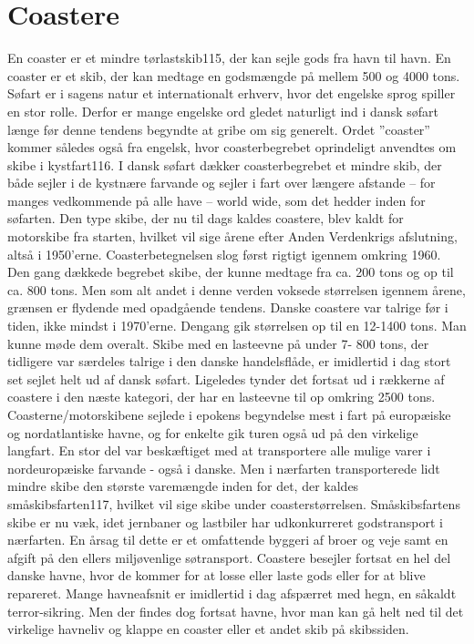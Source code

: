 \part{Coastere}\label{coastere}

En coaster er et mindre tørlastskib115, der kan sejle gods fra havn til
havn. En coaster er et skib, der kan medtage en godsmængde på mellem 500
og 4000 tons. Søfart er i sagens natur et internationalt erhverv, hvor
det engelske sprog spiller en stor rolle. Derfor er mange engelske ord
gledet naturligt ind i dansk søfart længe før denne tendens begyndte at
gribe om sig generelt. Ordet ''coaster'' kommer således også fra
engelsk, hvor coasterbegrebet oprindeligt anvendtes om skibe i
kystfart116. I dansk søfart dækker coasterbegrebet et mindre skib, der
både sejler i de kystnære farvande og sejler i fart over længere
afstande -- for manges vedkommende på alle have -- world wide, som det
hedder inden for søfarten. Den type skibe, der nu til dags kaldes
coastere, blev kaldt for motorskibe fra starten, hvilket vil sige årene
efter Anden Verdenkrigs afslutning, altså i 1950'erne.
Coasterbetegnelsen slog først rigtigt igennem omkring 1960. Den gang
dækkede begrebet skibe, der kunne medtage fra ca. 200 tons og op til ca.
800 tons. Men som alt andet i denne verden voksede størrelsen igennem
årene, grænsen er flydende med opadgående tendens. Danske coastere var
talrige før i tiden, ikke mindst i 1970'erne. Dengang gik størrelsen op
til en 12-1400 tons. Man kunne møde dem overalt. Skibe med en lasteevne
på under 7- 800 tons, der tidligere var særdeles talrige i den danske
handelsflåde, er imidlertid i dag stort set sejlet helt ud af dansk
søfart. Ligeledes tynder det fortsat ud i rækkerne af coastere i den
næste kategori, der har en lasteevne til op omkring 2500 tons.
Coasterne/motorskibene sejlede i epokens begyndelse mest i fart på
europæiske og nordatlantiske havne, og for enkelte gik turen også ud på
den virkelige langfart. En stor del var beskæftiget med at transportere
alle mulige varer i nordeuropæiske farvande - også i danske. Men i
nærfarten transporterede lidt mindre skibe den største varemængde inden
for det, der kaldes småskibsfarten117, hvilket vil sige skibe under
coasterstørrelsen. Småskibsfartens skibe er nu væk, idet jernbaner og
lastbiler har udkonkurreret godstransport i nærfarten. En årsag til
dette er et omfattende byggeri af broer og veje samt en afgift på den
ellers miljøvenlige søtransport. Coastere besejler fortsat en hel del
danske havne, hvor de kommer for at losse eller laste gods eller for at
blive repareret. Mange havneafsnit er imidlertid i dag afspærret med
hegn, en såkaldt terror-sikring. Men der findes dog fortsat havne, hvor
man kan gå helt ned til det virkelige havneliv og klappe en coaster
eller et andet skib på skibssiden.
